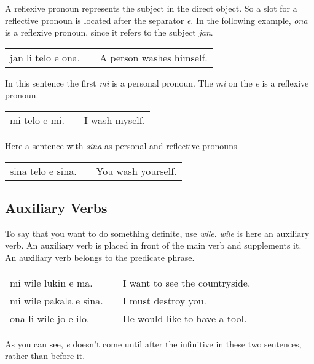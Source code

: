 A reflexive pronoun represents the subject in the direct object. 
So a slot for a reflective pronoun is located after the separator \textit{e}. 
In the following example, \textit{ona} is a reflexive pronoun, since it refers to the subject \textit{jan}. 

\begin{supertabular}{p{5,5cm}|ll}
jan li telo e ona. && A person washes himself. \\
\end{supertabular}

In this sentence the first \textit{mi} is a personal pronoun.
The \textit{mi} on the \textit{e} is a reflexive pronoun. 

\begin{supertabular}{p{5,5cm}|ll}
mi telo e mi. && I wash myself. \\
\end{supertabular}

Here a sentence with \textit{sina} as personal and reflective pronouns

\begin{supertabular}{p{5,5cm}|ll}
sina telo e sina. && You wash yourself. \\
\end{supertabular}





%
{}
\subsection*{Auxiliary Verbs}
%
To say that you want to do something definite, use \textit{wile}.
\textit{wile} is here an auxiliary verb. 
An auxiliary verb is placed in front of the main verb and supplements it. 
An auxiliary verb belongs to the predicate phrase. 

\begin{supertabular}{p{5,5cm}|ll}
mi wile lukin e ma. && I want to see the countryside. \\
mi wile pakala e sina. && I must destroy you. \\
ona li wile jo e ilo. && He would like to have a tool. \\
\end{supertabular} 

As you can see, \textit{e} doesn't come until after the infinitive in these two sentences, rather than before it. 

